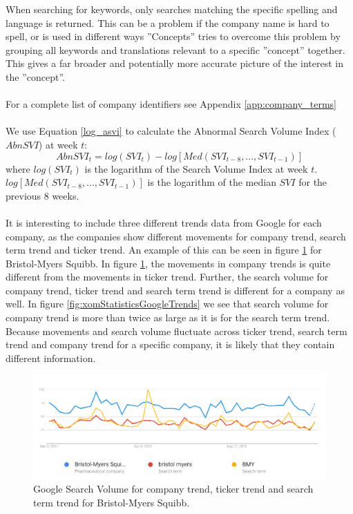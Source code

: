 When searching for keywords, only searches matching the specific spelling and language is returned. This can be a problem if the company name is hard to spell, or is used in different ways ”Concepts” tries to overcome this problem by grouping all keywords and translations relevant to a specific ”concept” together. This gives a far broader and potentially more accurate picture of the interest in the ”concept”.
\\\\
For a complete list of company identifiers see Appendix \ref{app:company_terms}
\\\\
We use Equation \eqref{log_asvi} to calculate the Abnormal Search Volume Index ($AbnSVI$) at week $t$:
\begin{equation}
   \label{log_asvi} 
   AbnSVI_{t} = log(SVI_{t}) - log[Med(SVI_{t-8},...,SVI_{t-1})] 
\end{equation}
where $log(SVI_{t})$ is the logarithm of the Search Volume Index at week $t$. $log[Med(SVI_{t-8},...,SVI_{t-1})]$ is the logarithm of the median $SVI$ for the previous 8 weeks.
\\\\
It is interesting to include three different trends data from Google for each company, as the companies show different movements for company trend, search term trend and ticker trend. An example of this can be seen in figure \ref{fig:bmyStatisticsGoogleTrends} for Bristol-Myers Squibb. In figure \ref{fig:bmyStatisticsGoogleTrends}, the movements in company trends is quite different from the movements in ticker trend. Further, the search volume for company trend, ticker trend and search term trend is different for a company as well. In figure \ref{fig:xomStatisticsGoogleTrends} we see that search volume for company trend is more than twice as large as it is for the search term trend. Because movements and search volume fluctuate across ticker trend, search term trend and company trend for a specific company, it is likely that they contain different information.   
\begin{figure}[h!]
  \centering
    \includegraphics[width=1\textwidth]{fig/bmyStatisticsGoogleTrendsAddedExplanation.png}
 \caption{Google Search Volume for company trend, ticker trend and search term trend for Bristol-Myers Squibb.}
\label{fig:bmyStatisticsGoogleTrends}
\end{figure}
